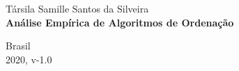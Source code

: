 \documentclass[a4paper, 12pt]{article}
\begin{document}
	
	\begin{titlepage}
		\begin{center}
			
			
			\large{Társila Samille Santos da Silveira}\\ 
			\vspace{155pt}
			\vspace{95pt}
			\textbf{\LARGE{ Análise Empírica de Algoritmos de Ordenação  }}\\
			\vspace{3,5cm}
		\end{center}
		
		
		
		
		\begin{center}
			\vspace{\fill}
			Brasil\\
			2020, v-1.0
		\end{center}
	\end{titlepage}
	
	
\end{document}
